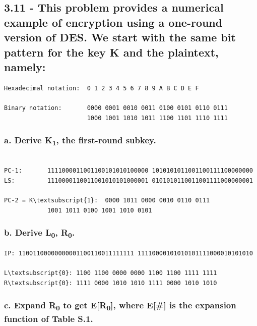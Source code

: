 \documentclass[
    article,            %
    11pt,               %
    oneside,            %
    a4paper,            %
    english,            %
    brazil,             %
    sumario=tradicional,
    ]{abntex2}
\begin{document}
\subsection*{\textbf{3.11 - This problem provides a numerical example of encryption using a one-round version of DES. We start with the same bit pattern for the key K and the plaintext, namely:}}
\begin{Verbatim}
Hexadecimal notation:  0 1 2 3 4 5 6 7 8 9 A B C D E F

Binary notation:       0000 0001 0010 0011 0100 0101 0110 0111
                       1000 1001 1010 1011 1100 1101 1110 1111
\end{Verbatim}
\subsubsection*{\textbf{a. Derive K\textsubscript{1}, the first-round subkey.}}

\begin{Verbatim}[commandchars=\\\{\}, fontsize=\footnotesize]

PC-1:       1111000011001100101010100000 1010101011001100111100000000
LS:         1110000110011001010101000001 0101010110011001111000000001

PC-2 = K\textsubscript{1}:  0000 1011 0000 0010 0110 0111 
            1001 1011 0100 1001 1010 0101

\end{Verbatim}

\subsubsection*{\textbf{b. Derive L\textsubscript{0}, R\textsubscript{0}.}}

\begin{Verbatim}[commandchars=\\\{\}, fontsize=\footnotesize]
IP: 11001100000000001100110011111111 11110000101010101111000010101010

L\textsubscript{0}: 1100 1100 0000 0000 1100 1100 1111 1111
R\textsubscript{0}: 1111 0000 1010 1010 1111 0000 1010 1010
\end{Verbatim}


\subsubsection*{\textbf{c. Expand R\textsubscript{0} to get E[R\textsubscript{0}], where E[\#] is the expansion function of Table S.1.}}
\end{document}
